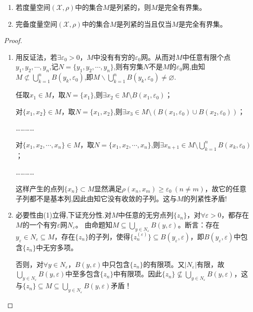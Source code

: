 \documentclass[../../main.tex]{subfiles}%
\begin{document}
\begin{theorem}[Hausdorff定理]\label{theorem:泛函分析--Hausdorff定理}
\begin{enumerate}[(1)]
\item 若度量空间$(\mathscr{X},\rho)$中的集合$M$是列紧的，则$M$是完全有界集。

\item 完备度量空间$(\mathscr{X},\rho)$中的集合$M$是列紧的当且仅当$M$是完全有界集。
\end{enumerate}
\end{theorem}
\begin{proof}
\begin{enumerate}[(1)]
\item 用反证法，若$\exists\varepsilon_0>0$，$M$中没有有穷的$\varepsilon_0$网。从而对$M$中任意有限个点$y_1,y_2,\cdots,y_n$,记$N=\{y_1,y_2,\cdots,y_n\}$,则有穷集$N$不是$M$的$\varepsilon_0$网,由知$M\nsubset \bigcup_{k=1}^n{B\left( y_k,\varepsilon _0 \right)}$,即$M\backslash \bigcup_{k=1}^n{B\left( y_k,\varepsilon _0 \right)}\neq \varnothing$.

任取$x_1\in M$，取$N=\{x_1\}$,则$\exists x_2\in M\setminus B(x_1,\varepsilon_0)$；

对$\{x_1,x_2\}\in M$，取$N=\{x_1,x_2\}$,则$\exists x_3\in M\setminus\left(B(x_1,\varepsilon_0)\cup B(x_2,\varepsilon_0)\right)$；

…………

对$\{x_1,x_2,\cdots,x_n\}\in M$，取$N=\{x_1,x_2,\cdots,x_n\}$,则$\exists x_{n+1}\in M\setminus\bigcup\limits_{k=1}^n B(x_k,\varepsilon_0)$；

…………

这样产生的点列$\{x_n\}\subset M$显然满足$\rho(x_n,x_m)\geqslant\varepsilon_0\ (n\neq m)$，故它的任意子列都不是基本列,因此由知它没有收敛的子列。这与$M$的列紧性矛盾!

\item 必要性由(1)立得,下证充分性.对$M$中任意的无穷点列$\{z_n\}$，对$\forall \varepsilon >0$，都存在$M$的一个有穷$\varepsilon$网$N_{\varepsilon}$。
由命题知$M\subseteq \bigcup\limits_{y\in N_{\varepsilon}}B\left( y,\varepsilon \right)$。断言：存在$y_{\varepsilon}\in N_{\varepsilon}\subseteq M$，存在$\{z_n\}$的子列，使得$\{z_n^{(\varepsilon)}\}\subseteq B\left( y_{\varepsilon},\varepsilon \right)$，即$B\left( y_{\varepsilon},\varepsilon \right)$中包含$\{z_n\}$中无穷多项。

否则，对$\forall y\in N_{\varepsilon}$，$B\left( y,\varepsilon \right)$中只包含$\{z_n\}$的有限项。又$|N_{\varepsilon}|$有限，故$\bigcup\limits_{y\in N_{\varepsilon}}B\left( y,\varepsilon \right)$中至多包含$\{z_n\}$中有限项。因此$\{z_n\}\not\subseteq \bigcup\limits_{y\in N_{\varepsilon}}B\left( y,\varepsilon \right)$，这与$\{z_n\}\subseteq M\subseteq \bigcup\limits_{y\in N_{\varepsilon}}B\left( y,\varepsilon \right)$矛盾！


\end{enumerate}
\end{proof}
\end{document}
